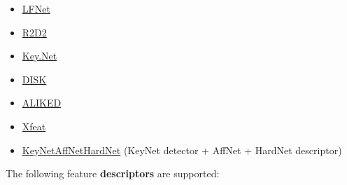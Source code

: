 \documentclass{article}
\begin{document}
\begin{itemize}
    \item \href{https://github.com/vcg-uvic/lf-net-release}{LFNet} \cite{ono2018lf}
    \item \href{https://github.com/naver/r2d2}{R2D2} \cite{revaud2019r2d2}
    \item \href{https://github.com/axelBarroso/Key.Net}{Key.Net} \cite{barroso2020key}
    \item \href{https://arxiv.org/abs/2006.13566}{DISK} \cite{tyszkiewicz2020disk}
    \item \href{https://arxiv.org/abs/2304.03608}{ALIKED} \cite{barroso2023alike}
    \item \href{https://arxiv.org/abs/2404.19174}{Xfeat} \cite{barroso2024xfeat}
    \item \href{https://github.com/axelBarroso/Key.Net}{KeyNetAffNetHardNet} (KeyNet detector + AffNet + HardNet descriptor)
\end{itemize}

The following feature \textbf{descriptors} are supported: 
\end{document}
